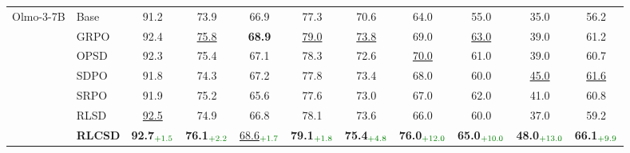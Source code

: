 \begin{table}[t]
{\begin{tabular}{llcccc ccccc}
\midrule

\multirow{7}{*}{Olmo-3-7B}
 & Base  & 91.2 & 73.9 & 66.9 & 77.3 & 70.6 & 64.0 & 55.0 & 35.0 & 56.2 \\
 & GRPO  & 92.4 & \underline{75.8} & \textbf{68.9} & \underline{79.0} & \underline{73.8} & 69.0 & \underline{63.0} & 39.0 & 61.2 \\
 & OPSD  & 92.3 & 75.4 & 67.1 & 78.3 & 72.6 & \underline{70.0} & 61.0 & 39.0 & 60.7 \\
 & SDPO  & 91.8 & 74.3 & 67.2 & 77.8 & 73.4 & 68.0 & 60.0 & \underline{45.0} & \underline{61.6} \\
 & SRPO  & 91.9 & 75.2 & 65.6 & 77.6 & 73.0 & 67.0 & 62.0 & 41.0 & 60.8 \\
 & RLSD  & \underline{92.5} & 74.9 & 66.8 & 78.1 & 73.6 & 66.0 & 60.0 & 37.0 & 59.2 \\
 \rowcolor{gray!30}
 & \textbf{RLCSD}
   & \textbf{92.7}$_{\textcolor{green!50!black}{+1.5}}$
   & \textbf{76.1}$_{\textcolor{green!50!black}{+2.2}}$
   & \underline{68.6}$_{\textcolor{green!50!black}{+1.7}}$
   & \textbf{79.1}$_{\textcolor{green!50!black}{+1.8}}$
   & \textbf{75.4}$_{\textcolor{green!50!black}{+4.8}}$
   & \textbf{76.0}$_{\textcolor{green!50!black}{+12.0}}$
   & \textbf{65.0}$_{\textcolor{green!50!black}{+10.0}}$
   & \textbf{48.0}$_{\textcolor{green!50!black}{+13.0}}$
   & \textbf{66.1}$_{\textcolor{green!50!black}{+9.9}}$ \\

\bottomrule
\end{tabular}%
}
\end{table}